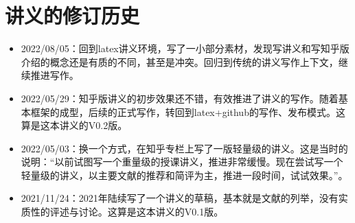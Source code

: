\documentclass[UTF8]{ctexrep}
\begin{document}
%
%
%    
%    




\chapter{讲义的修订历史}

\renewcommand{\labelitemi}{\Writinghand}
%
\begin{itemize}
    \item 2022/08/05：回到latex讲义环境，写了一小部分素材，发现写讲义和写知乎版介绍的概念还是有质的不同，甚至是冲突。回归到传统的讲义写作上下文，继续推进写作。

    \item 2022/05/29：知乎版讲义的初步效果还不错，有效推进了讲义的写作。随着基本框架的成型，后续的正式写作，转回到latex+github的写作、发布模式。这算是这本讲义的V0.2版。
    
    \item 2022/05/03：换一个方式，在知乎专栏上写了一版轻量级的讲义。这是当时的说明：“以前试图写一个重量级的授课讲义，推进非常缓慢。现在尝试写一个轻量级的讲义，以主要文献的推荐和简评为主，推进一段时间，试试效果。”。
    
    \item 2021/11/24：2021年陆续写了一个讲义的草稿，基本就是文献的列举，没有实质性的评述与讨论。这算是这本讲义的V0.1版。
\end{itemize}


%
%




\end{document}
